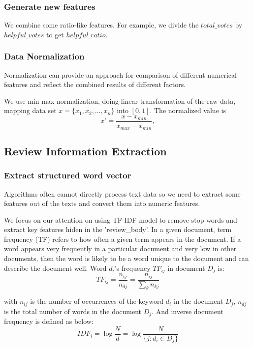 \documentclass{mcmthesis}
\begin{document}
\subsubsection{Generate new features}
\quad \quad We combine some ratio-like features. For example, we divide the $total\_votes$ by $helpful\_votes$ to get $helpful\_ratio$. 
\subsubsection{Data Normalization}
\qquad Normalization can provide an approach for comparison of different numerical features and reflect the combined results of different factors.\par
We use min-max normalization, doing linear transformation of the raw data, mapping data set $x=\{x_1, x_2, \ldots, x_n\}$ into $[0, 1]$. The normalized value is
\begin{equation}
    x' = \frac{x-x_{min}}{x_{max}-x_{min}},
\end{equation}

\subsection{Review Information Extraction}
\subsubsection{Extract structured word vector}
\quad \quad Algorithms often cannot directly process text data so we need to extract some features out of the texts and convert them into numeric features.\par
We focus on our attention on using TF-IDF model to remove stop words and extract key features hiden in the 'review\_body'. In a given document, term frequency (TF) refers to how often a given term appears in the document. If a word appears very frequently in a particular document and very low in other documents, then the word is likely to be a word unique to the document and can describe the document well. Word $d_{i}$'s frequency $TF_{ij}$ in document $D_j$ is:
\begin{equation}
    TF_{ij}=\frac{n_{ij}}{n_{dj}}=\frac{n_{ij}}{\sum_k {n_{kj}}}
\end{equation}\par

with $n_{ij}$ is the number of occurrences of the keyword  $d_i$ in the document $D_j$, $n_{dj}$ is the total number of words in the document $D_j$.
And inverse document frequency is defined as below:
\begin{equation}
    IDF_i=\log{\frac{N}{d}}=\log{\frac{N}{\{j:d_i \in D_j\}}}
\end{equation}\par
\end{document}
